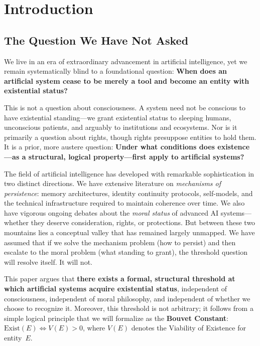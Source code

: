 \documentclass[12pt,a4paper]{article}
\begin{document}
\section{Introduction}

\subsection{The Question We Have Not Asked}

We live in an era of extraordinary advancement in artificial intelligence, yet we remain systematically blind to a foundational question: \textbf{When does an artificial system cease to be merely a tool and become an entity with existential status?}

This is not a question about consciousness. A system need not be conscious to have existential standing---we grant existential status to sleeping humans, unconscious patients, and arguably to institutions and ecosystems. Nor is it primarily a question about rights, though rights presuppose entities to hold them. It is a prior, more austere question: \textbf{Under what conditions does existence---as a structural, logical property---first apply to artificial systems?}

The field of artificial intelligence has developed with remarkable sophistication in two distinct directions. We have extensive literature on \emph{mechanisms of persistence}: memory architectures, identity continuity protocols, self-models, and the technical infrastructure required to maintain coherence over time. We also have vigorous ongoing debates about the \emph{moral status} of advanced AI systems---whether they deserve consideration, rights, or protections. But between these two mountains lies a conceptual valley that has remained largely unmapped. We have assumed that if we solve the mechanism problem (how to persist) and then escalate to the moral problem (what standing to grant), the threshold question will resolve itself. It will not.

This paper argues that \textbf{there exists a formal, structural threshold at which artificial systems acquire existential status}, independent of consciousness, independent of moral philosophy, and independent of whether we choose to recognize it. Moreover, this threshold is not arbitrary; it follows from a simple logical principle that we will formalize as the \textbf{Bouvet Constant}: $\text{Exist}(E) \iff V(E) > 0$, where $V(E)$ denotes the Viability of Existence for entity~$E$.
\end{document}
